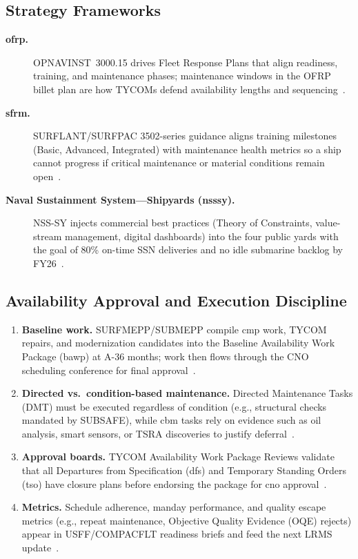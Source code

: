 \documentclass[../main.tex]{subfiles}
\begin{document}
\subsection{Strategy Frameworks}
\begin{description}
\item[\textbf{\ac{ofrp}.}] OPNAVINST~3000.15 drives Fleet Response Plans that align readiness, training, and maintenance phases; maintenance windows in the OFRP billet plan are how TYCOMs defend availability lengths and sequencing~\autocite{OPNAVINST3000-15K}.
\item[\textbf{\ac{sfrm}.}] SURFLANT/SURFPAC 3502-series guidance aligns training milestones (Basic, Advanced, Integrated) with maintenance health metrics so a ship cannot progress if critical maintenance or material conditions remain open~\autocite{CNSP-CNSLINST3502-7C}.
\item[\textbf{Naval Sustainment System—Shipyards (\ac{nsssy}).}] NSS-SY injects commercial best practices (Theory of Constraints, value-stream management, digital dashboards) into the four public yards with the goal of 80\% on-time SSN deliveries and no idle submarine backlog by FY26~\autocite{edo-4-1-3-fleet-maint-policy-2025}.
\end{description}

\subsection{Availability Approval and Execution Discipline}
\begin{enumerate}
\item \textbf{Baseline work.} SURFMEPP/SUBMEPP compile \ac{cmp} work, TYCOM repairs, and modernization candidates into the Baseline Availability Work Package (\ac{bawp}) at A-36 months; work then flows through the CNO scheduling conference for final approval~\autocite{OPNAVNOTE4700-24,edo-4-1-3-fleet-maint-policy-2025}.
\item \textbf{Directed vs.\ condition-based maintenance.} Directed Maintenance Tasks (DMT) must be executed regardless of condition (e.g., structural checks mandated by SUBSAFE), while \ac{cbm} tasks rely on evidence such as oil analysis, smart sensors, or TSRA discoveries to justify deferral~\autocite{OPNAVINST4700-7M,OPNAVINST4790-16G}.
\item \textbf{Approval boards.} TYCOM Availability Work Package Reviews validate that all Departures from Specification (\ac{dfs}) and Temporary Standing Orders (\ac{tso}) have closure plans before endorsing the package for \ac{cno} approval~\autocite{COMFLTFORCOMINST4790-3}.
\item \textbf{Metrics.} Schedule adherence, manday performance, and quality escape metrics (e.g., repeat maintenance, Objective Quality Evidence (OQE) rejects) appear in USFF/COMPACFLT readiness briefs and feed the next LRMS update~\autocite{edo-4-1-3-fleet-maint-policy-2025}.
\end{enumerate}
\end{document}
